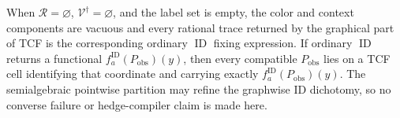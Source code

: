 When \(\mathcal R=\varnothing\), \(\mathcal V^{\dagger}=\varnothing\), and the label set is empty, the color and context components are vacuous and every rational trace returned by the graphical part of TCF is the corresponding ordinary \(\operatorname{ID}\) fixing expression. If ordinary \(\operatorname{ID}\) returns a functional \(f_a^{\mathrm{ID}}(P_{\mathrm{obs}})(y)\), then every compatible \(P_{\mathrm{obs}}\) lies on a TCF cell identifying that coordinate and carrying exactly \(f_a^{\mathrm{ID}}(P_{\mathrm{obs}})(y)\). The semialgebraic pointwise partition may refine the graphwise ID dichotomy, so no converse failure or hedge-compiler claim is made here.